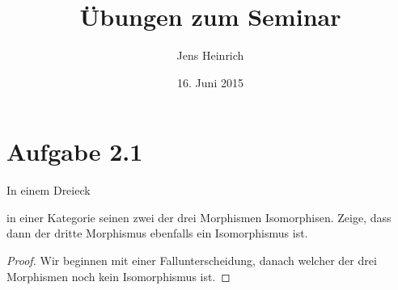 \documentclass{article}
\title{\"Ubungen zum Seminar \boldfont{Kategorientheorie} }
\author{Jens Heinrich}
\date{16. Juni 2015}
\begin{document}
 
	\maketitle
\section*{Aufgabe 2.1}
	In einem Dreieck 

	
	in einer Kategorie seinen zwei der drei Morphismen Isomorphisen.
	Zeige, dass dann der dritte Morphismus ebenfalls ein Isomorphismus ist.
	\begin{proof}
		Wir beginnen mit einer Fallunterscheidung, danach welcher der drei Morphismen noch kein Isomorphismus ist.
	\end{proof}
\end{document}
